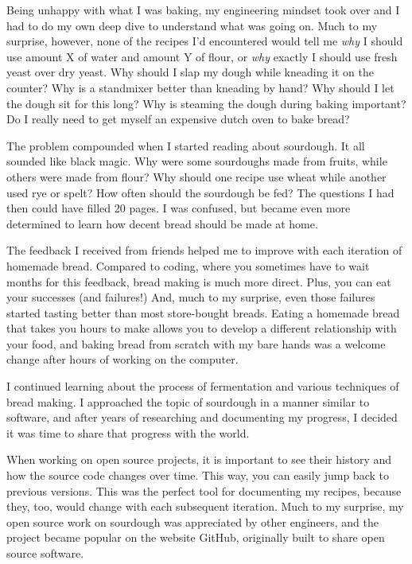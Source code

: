 Being unhappy with what I was baking, my engineering mindset took over and I had
to do my own deep dive to understand what was going on. Much to my surprise, however,
none of the recipes I'd encountered would tell me {\it why} I should use amount X
of water and amount Y of flour, or {\it why} exactly I should use fresh yeast over dry yeast. Why
should I slap my dough while kneading it on the counter? Why is a standmixer
better than kneading by hand?  Why should I let the dough sit for this long?
Why is steaming the dough during baking important? Do I really need to
get myself an expensive dutch oven to bake bread?

The problem compounded when I started reading about sourdough. It all sounded like black
magic. Why were some sourdoughs made from fruits, while others were made from flour?
Why should one recipe use wheat while another used rye or spelt? How often should the
sourdough be fed? The questions I had then could have filled 20 pages. I was confused,
but became even more determined to learn how decent bread should be made at home.

The feedback I received from friends helped me to improve with each
iteration of homemade bread. Compared to coding, where you sometimes have to wait months
for this feedback, bread making is much more direct. Plus, you can eat your successes
(and failures!) And, much to my surprise, even those failures started tasting better than
most store-bought breads. Eating a homemade bread that takes you hours to make allows you
to develop a different relationship with your food, and baking bread from scratch with my
bare hands was a welcome change after hours of working on the computer.

I continued learning about the process of fermentation and various techniques of bread making.
I approached the topic of sourdough in a manner similar to software, and after years of
researching and documenting my progress, I decided it was time to share that progress with the
world.

When working on open source projects, it is important to see their history and how the source
code changes over time. This way, you can easily jump back to previous versions. This was
the perfect tool for documenting my recipes, because they, too, would change with each
subsequent iteration. Much to my surprise, my open source work on sourdough was appreciated
by other engineers, and the project became popular on the website GitHub, originally built to
share open source software.

